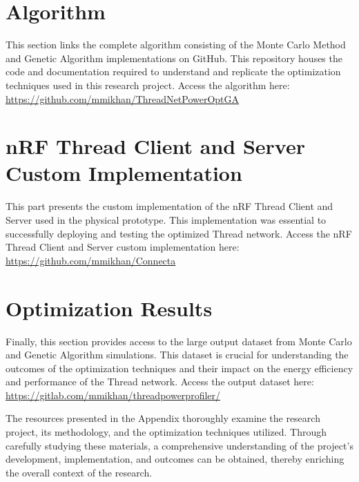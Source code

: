 \section{Algorithm}
This section links the complete algorithm consisting of the Monte Carlo Method and Genetic Algorithm implementations on GitHub. This repository houses the code and documentation required to understand and replicate the optimization techniques used in this research project. Access the algorithm here: \url{https://github.com/mmikhan/ThreadNetPowerOptGA}

\section{nRF Thread Client and Server Custom Implementation}
This part presents the custom implementation of the nRF Thread Client and Server used in the physical prototype. This implementation was essential to successfully deploying and testing the optimized Thread network. Access the nRF Thread Client and Server custom implementation here: \url{https://github.com/mmikhan/Connecta}

\section{Optimization Results}
Finally, this section provides access to the large output dataset from Monte Carlo and Genetic Algorithm simulations. This dataset is crucial for understanding the outcomes of the optimization techniques and their impact on the energy efficiency and performance of the Thread network. Access the output dataset here: \url{https://gitlab.com/mmikhan/threadpowerprofiler/}

\vspace{2mm}
The resources presented in the Appendix thoroughly examine the research project, its methodology, and the optimization techniques utilized. Through carefully studying these materials, a comprehensive understanding of the project's development, implementation, and outcomes can be obtained, thereby enriching the overall context of the research.


